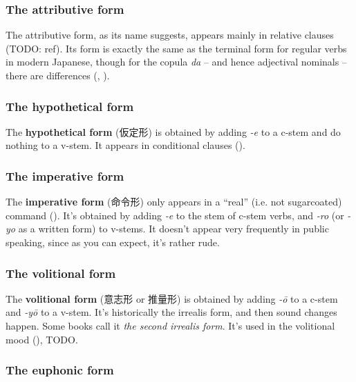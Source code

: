 \documentclass[UTF8, a4paper, oneside, scheme=plain]{ctexrep}
\newcommand*{\concept}[1]{\textbf{#1}}
\newcommand*{\term}[1]{\emph{#1}}
\newcommand{\corpus}[1]{\emph{#1}}
\begin{document}
\subsubsection{The attributive form}

The attributive form, as its name suggests, appears mainly in relative clauses (TODO: ref).
Its form is exactly the same as the terminal form for regular verbs in modern Japanese,
though for the copula \corpus{da} -- and hence adjectival nominals -- there are differences 
(, ).

\subsubsection{The hypothetical form}

The \concept{hypothetical form} (仮定形) is obtained by adding \corpus{-e} to a c-stem and do nothing to a v-stem.
It appears in conditional clauses ().

\subsubsection{The imperative form}\label{sec:imperative-form}

The \concept{imperative form} (命令形) only appears in a ``real'' (i.e. not sugarcoated) command 
().
It's obtained by adding \corpus{-e} to the stem of c-stem verbs,
and \corpus{-ro} (or \corpus{-yo} as a written form) to v-stems.
It doesn't appear very frequently in public speaking, 
since as you can expect, 
it's rather rude.

\subsubsection{The volitional form}\label{sec:volition-form}

The \concept{volitional form} (意志形 or 推量形)
is obtained by adding \corpus{-\={o}} to a c-stem and \corpus{-y\={o}} to a v-stem.
It's historically the irrealis form,
and then sound changes happen.
Some books call it \term{the second irrealis form}.
It's used in the volitional mood (), TODO.

\subsubsection{The euphonic form}\label{sec:euphonic-form}
\end{document}

